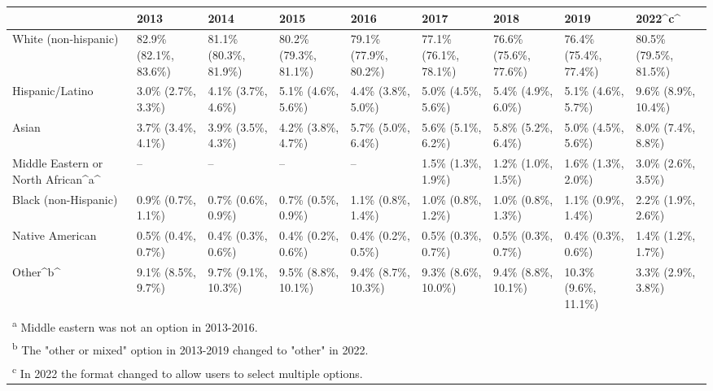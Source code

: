 \documentclass[
]{book}
\begin{document}
\begin{table}
\centering
\begin{tabular}[t]{>{}l|>{}l|>{}l|>{}l|>{}l|>{}l|>{}l|>{}l|>{}l}
\hline
  & 2013 & 2014 & 2015 & 2016 & 2017 & 2018 & 2019 & 2022\textasciicircum{}c\textasciicircum{}\\
\hline
White (non-hispanic) & 82.9\% (82.1\%, 83.6\%) & 81.1\% (80.3\%, 81.9\%) & 80.2\% (79.3\%, 81.1\%) & 79.1\% (77.9\%, 80.2\%) & 77.1\% (76.1\%, 78.1\%) & 76.6\% (75.6\%, 77.6\%) & 76.4\% (75.4\%, 77.4\%) & 80.5\% (79.5\%, 81.5\%)\\
\hline
Hispanic/Latino & 3.0\% (2.7\%, 3.3\%) & 4.1\% (3.7\%, 4.6\%) & 5.1\% (4.6\%, 5.6\%) & 4.4\% (3.8\%, 5.0\%) & 5.0\% (4.5\%, 5.6\%) & 5.4\% (4.9\%, 6.0\%) & 5.1\% (4.6\%, 5.7\%) & 9.6\% (8.9\%, 10.4\%)\\
\hline
Asian & 3.7\% (3.4\%, 4.1\%) & 3.9\% (3.5\%, 4.3\%) & 4.2\% (3.8\%, 4.7\%) & 5.7\% (5.0\%, 6.4\%) & 5.6\% (5.1\%, 6.2\%) & 5.8\% (5.2\%, 6.4\%) & 5.0\% (4.5\%, 5.6\%) & 8.0\% (7.4\%, 8.8\%)\\
\hline
Middle Eastern or North African\textasciicircum{}a\textasciicircum{} & -- & -- & -- & -- & 1.5\% (1.3\%, 1.9\%) & 1.2\% (1.0\%, 1.5\%) & 1.6\% (1.3\%, 2.0\%) & 3.0\% (2.6\%, 3.5\%)\\
\hline
Black (non-Hispanic) & 0.9\% (0.7\%, 1.1\%) & 0.7\% (0.6\%, 0.9\%) & 0.7\% (0.5\%, 0.9\%) & 1.1\% (0.8\%, 1.4\%) & 1.0\% (0.8\%, 1.2\%) & 1.0\% (0.8\%, 1.3\%) & 1.1\% (0.9\%, 1.4\%) & 2.2\% (1.9\%, 2.6\%)\\
\hline
Native American & 0.5\% (0.4\%, 0.7\%) & 0.4\% (0.3\%, 0.6\%) & 0.4\% (0.2\%, 0.6\%) & 0.4\% (0.2\%, 0.5\%) & 0.5\% (0.3\%, 0.7\%) & 0.5\% (0.3\%, 0.7\%) & 0.4\% (0.3\%, 0.6\%) & 1.4\% (1.2\%, 1.7\%)\\
\hline
Other\textasciicircum{}b\textasciicircum{} & 9.1\% (8.5\%, 9.7\%) & 9.7\% (9.1\%, 10.3\%) & 9.5\% (8.8\%, 10.1\%) & 9.4\% (8.7\%, 10.3\%) & 9.3\% (8.6\%, 10.0\%) & 9.4\% (8.8\%, 10.1\%) & 10.3\% (9.6\%, 11.1\%) & 3.3\% (2.9\%, 3.8\%)\\
\hline
\multicolumn{9}{l}{\rule{0pt}{1em}\textsuperscript{a} Middle eastern was not an option in 2013-2016.}\\
\multicolumn{9}{l}{\rule{0pt}{1em}\textsuperscript{b} The "other or mixed" option in 2013-2019 changed to "other" in 2022.}\\
\multicolumn{9}{l}{\rule{0pt}{1em}\textsuperscript{c} In 2022 the format changed to allow users to select multiple options.}\\
\end{tabular}
\end{table}
\end{document}
